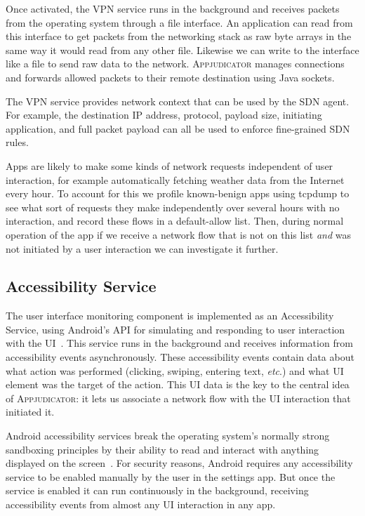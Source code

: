 Once activated, the VPN service runs in the background and receives packets from
the operating system through a file interface. An application can read from this
interface to get packets from the networking stack as raw byte arrays in the
same way it would read from any other file. Likewise we can write to the
interface like a file to send raw data to the network. \textsc{Appjudicator}
manages connections and forwards allowed packets to their remote destination
using Java sockets.

The VPN service provides network context that can be used by the SDN agent. For
example, the destination IP address, protocol, payload size, initiating
application, and full packet payload can all be used to enforce fine-grained SDN
rules.

Apps are likely to make some kinds of network requests independent of user
interaction, for example automatically fetching weather data from the Internet
every hour. To account for this we profile known-benign apps using tcpdump to
see what sort of requests they make independently over several hours with no
interaction, and record these flows in a default-allow list. Then, during normal
operation of the app if we receive a network flow that is not on this list
\textit{and} was not initiated by a user interaction we can investigate it
further.

\subsection{Accessibility Service}
\label{sec:approach-accessibility-service}

The user interface monitoring component is implemented as an Accessibility
Service, using Android's API for simulating and responding to user interaction
with the UI~\cite{googledevelopers2020}. This service runs in the background and
receives information from accessibility events asynchronously. These
accessibility events contain data about what action was performed (clicking,
swiping, entering text, \textit{etc}.) and what UI element was the target of the
action. This UI data is the key to the central idea of \textsc{Appjudicator}: it
lets us associate a network flow with the UI interaction that initiated it.

Android accessibility services break the operating system's normally strong
sandboxing principles by their ability to read and interact with anything
displayed on the screen~\cite{kalysch2018}. For security reasons, Android
requires any accessibility service to be enabled manually by the user in the
settings app. But once the service is enabled it can run continuously in the
background, receiving accessibility events from almost any UI interaction in any
app.

